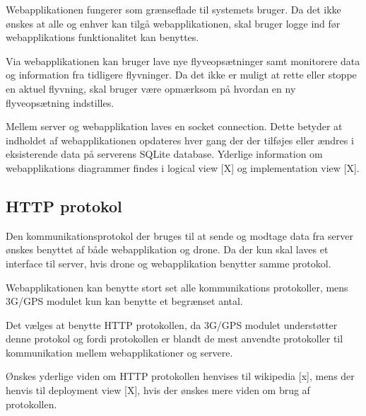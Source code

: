 Webapplikationen fungerer som grænseflade til systemets bruger. Da det ikke ønskes at alle og enhver kan tilgå webapplikationen, skal bruger logge ind før webapplikations funktionalitet kan benyttes. 

Via webapplikationen kan bruger lave nye flyveopsætninger samt monitorere data og information fra tidligere flyvninger. Da det ikke er muligt at rette eller stoppe en aktuel flyvning, skal bruger være opmærksom på hvordan en ny flyveopsætning indstilles. 

Mellem server og webapplikation laves en socket connection. Dette betyder at indholdet af webapplikationen opdateres hver gang der der tilføjes eller ændres i eksisterende data på serverens SQLite database. Yderlige information om webapplikations diagrammer findes i logical view [X] og implementation view [X].


\subsection{HTTP protokol}

Den kommunikationsprotokol der bruges til at sende og modtage data fra server ønskes benyttet af både webapplikation og drone. Da der kun skal laves et interface til server, hvis drone og webapplikation benytter samme protokol.

Webapplikationen kan benytte stort set alle kommunikations protokoller, mens 3G/GPS modulet kun kan benytte et begrænset antal.

Det vælges at benytte HTTP protokollen, da 3G/GPS modulet understøtter denne protokol og fordi protokollen er blandt de mest anvendte protokoller til kommunikation mellem webapplikationer og servere.

Ønskes yderlige viden om HTTP protokollen henvises til wikipedia [x], mens der henvis til deployment view [X], hvis der ønskes mere viden om brug af protokollen. 

